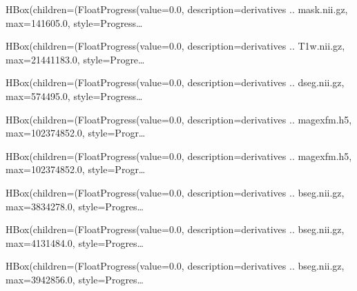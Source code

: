 \documentclass[letterpaper,10pt,english]{sphinxmanual}
\begin{document}
\begin{sphinxVerbatim}[commandchars=\\\{\}]
HBox(children=(FloatProgress(value=0.0, description=\PYGZsq{}derivatives .. mask.nii.gz\PYGZsq{}, max=141605.0, style=Progress…
\end{sphinxVerbatim}

\begin{sphinxVerbatim}[commandchars=\\\{\}]
HBox(children=(FloatProgress(value=0.0, description=\PYGZsq{}derivatives .. \PYGZus{}T1w.nii.gz\PYGZsq{}, max=21441183.0, style=Progre…
\end{sphinxVerbatim}

\begin{sphinxVerbatim}[commandchars=\\\{\}]
HBox(children=(FloatProgress(value=0.0, description=\PYGZsq{}derivatives .. dseg.nii.gz\PYGZsq{}, max=574495.0, style=Progress…
\end{sphinxVerbatim}

\begin{sphinxVerbatim}[commandchars=\\\{\}]
HBox(children=(FloatProgress(value=0.0, description=\PYGZsq{}derivatives .. mage\PYGZus{}xfm.h5\PYGZsq{}, max=102374852.0, style=Progr…
\end{sphinxVerbatim}

\begin{sphinxVerbatim}[commandchars=\\\{\}]
HBox(children=(FloatProgress(value=0.0, description=\PYGZsq{}derivatives .. mage\PYGZus{}xfm.h5\PYGZsq{}, max=102374852.0, style=Progr…
\end{sphinxVerbatim}

\begin{sphinxVerbatim}[commandchars=\\\{\}]
HBox(children=(FloatProgress(value=0.0, description=\PYGZsq{}derivatives .. bseg.nii.gz\PYGZsq{}, max=3834278.0, style=Progres…
\end{sphinxVerbatim}

\begin{sphinxVerbatim}[commandchars=\\\{\}]
HBox(children=(FloatProgress(value=0.0, description=\PYGZsq{}derivatives .. bseg.nii.gz\PYGZsq{}, max=4131484.0, style=Progres…
\end{sphinxVerbatim}

\begin{sphinxVerbatim}[commandchars=\\\{\}]
HBox(children=(FloatProgress(value=0.0, description=\PYGZsq{}derivatives .. bseg.nii.gz\PYGZsq{}, max=3942856.0, style=Progres…
\end{sphinxVerbatim}
\end{document}
